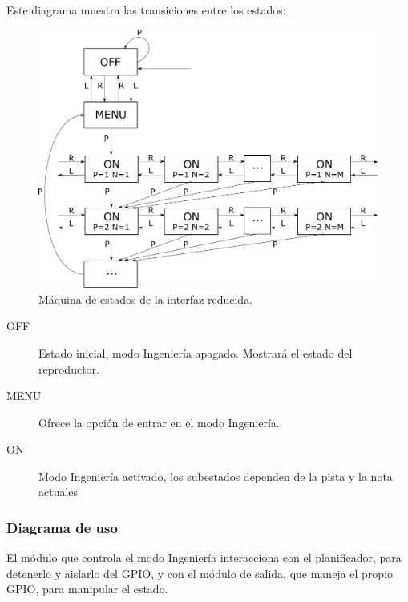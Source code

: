 Este diagrama muestra las transiciones entre los estados:

\smallskip

\begin{figure}[H]
	\noindent \begin{centering}
		\includegraphics[width=\linewidth*3/4]{capitulo4/engineer}
		\par\end{centering}
	\smallskip
	\caption{\label{fig:engineer} Máquina de estados de la interfaz reducida.}
\end{figure} 

\smallskip

\begin{description}
	\item[OFF] Estado inicial, modo Ingeniería apagado. Mostrará el estado del reproductor.
	\item[MENU] Ofrece la opción de entrar en el modo Ingeniería.
	\item[ON] Modo Ingeniería activado, los subestados dependen de la pista y la nota actuales
\end{description}

\subsubsection{Diagrama de uso}

El módulo que controla el modo Ingeniería interacciona con el planificador, para detenerlo y aislarlo del \acrshort{GPIO}, y con el módulo de salida, que maneja el propio \acrshort{GPIO}, para manipular el estado.

